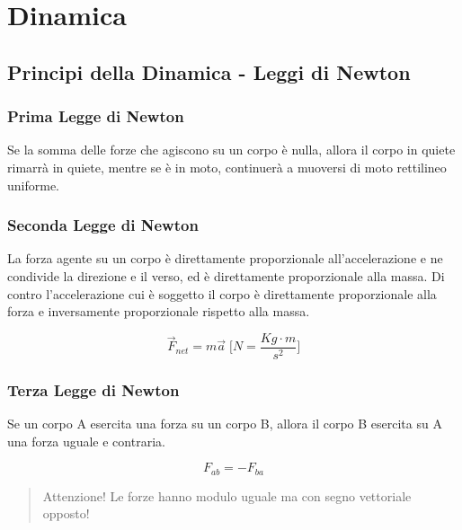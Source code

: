 \chapter*{Dinamica}

    \section*{Principi della Dinamica - Leggi di Newton}

        \subsection*{Prima Legge di Newton} Se la somma delle forze che agiscono 
        su un corpo è nulla, allora il corpo in quiete rimarrà in quiete, 
        mentre se è in moto, continuerà a muoversi di moto rettilineo uniforme.

        \subsection*{Seconda Legge di Newton} La forza agente su un corpo è 
        direttamente proporzionale all'accelerazione e ne condivide la 
        direzione e il verso, ed è direttamente proporzionale alla massa. Di 
        contro l'accelerazione cui è soggetto il corpo è direttamente 
        proporzionale alla forza e inversamente proporzionale rispetto alla 
        massa.

        \begin{equation*}
            \vec{F}_{net} = m \vec{a} \; \Bigg[N = \frac{Kg \cdot m}
            {s^2} \Bigg]
        \end{equation*}

        \subsection*{Terza Legge di Newton} Se un corpo A esercita una forza su 
        un corpo B, allora il corpo B esercita su A una forza uguale e 
        contraria.

        \begin{equation*}
            F_{ab} = - F_{ba}
        \end{equation*}

        \begin{quote}
            Attenzione! Le forze hanno modulo uguale ma con segno vettoriale 
            opposto!
        \end{quote}

